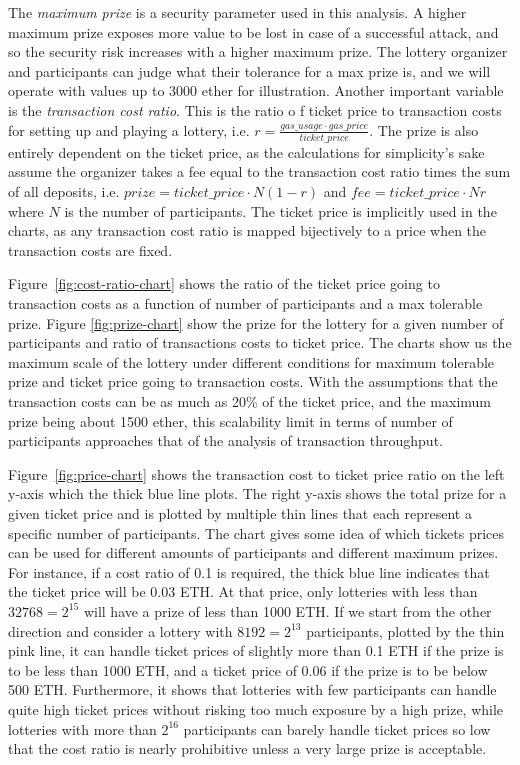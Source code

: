 The \emph{maximum prize} is a security parameter used in this analysis. A higher maximum prize exposes more value to be lost in case of a successful attack, and so the security risk increases with a higher maximum prize. The lottery organizer and participants can judge what their tolerance for a max prize is, and we will operate with values up to 3000 ether for illustration. Another important variable is the \emph{transaction cost ratio}. This is the ratio o  f ticket price to transaction costs for setting up and playing a lottery, i.e. $r=\frac{gas\_usage \cdot gas\_price}{ticket\_price}$. The prize is also entirely dependent on the ticket price, as the calculations for simplicity's sake assume the organizer takes a fee equal to the transaction cost ratio times the sum of all deposits, i.e. $prize=ticket\_price \cdot N(1-r)$ and $fee=ticket\_price \cdot Nr$ where $N$ is the number of participants. The ticket price is implicitly used in the charts, as any transaction cost ratio is mapped bijectively to a price when the transaction costs are fixed.

Figure~\ref{fig:cost-ratio-chart} shows the ratio of the ticket price going to transaction costs as a function of number of participants and a max tolerable prize. Figure \ref{fig:prize-chart} show the prize for the lottery for a given number of participants and ratio of transactions costs to ticket price.
The charts show us the maximum scale of the lottery under different conditions for maximum tolerable prize and ticket price going to transaction costs. With the assumptions that the transaction costs can be as much as 20\% of the ticket price, and the maximum prize being about 1500 ether, this scalability limit in terms of number of participants approaches that of the analysis of transaction throughput.

Figure~\ref{fig:price-chart} shows the transaction cost to ticket price ratio on the left y-axis which the thick blue line plots. The right y-axis shows the total prize for a given ticket price and is plotted by multiple thin lines that each represent a specific number of participants. The chart gives some idea of which tickets prices can be used for different amounts of participants and different maximum prizes. For instance, if a cost ratio of 0.1 is required, the thick blue line indicates that the ticket price will be 0.03 ETH. At that price, only lotteries with less than $32768=2^{15}$ will have a prize of less than 1000 ETH. If we start from the other direction and consider a lottery with $8192=2^{13}$ participants, plotted by the thin pink line, it can handle ticket prices of slightly more than 0.1 ETH if the prize is to be less than 1000 ETH, and a ticket price of 0.06 if the prize is to be below 500 ETH. Furthermore, it shows that lotteries with few participants can handle quite high ticket prices without risking too much exposure by a high prize, while lotteries with more than $2^{16}$ participants can barely handle ticket prices so low that the cost ratio is nearly prohibitive unless a very large prize is acceptable.

